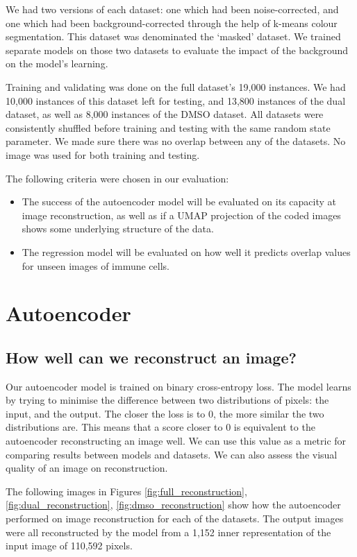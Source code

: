 We had two versions of each dataset: one which had been noise-corrected, and one which had been background-corrected through the help of k-means colour segmentation. This dataset was denominated the `masked' dataset. We trained separate models on those two datasets to evaluate the impact of the background on the model's learning. 

Training and validating was done on the full dataset's 19,000 instances. We had 10,000 instances of this dataset left for testing, and 13,800 instances of the dual dataset, as well as 8,000 instances of the DMSO dataset. All datasets were consistently shuffled before training and testing with the same random state parameter. We made sure there was no overlap between any of the datasets. No image was used for both training and testing. 

The following criteria were chosen in our evaluation:

\begin{itemize}
    \item The success of the autoencoder model will be evaluated on its capacity at image reconstruction, as well as if a UMAP projection of the coded images shows some underlying structure of the data. 
    \item The regression model will be evaluated on how well it predicts overlap values for unseen images of immune cells. 
\end{itemize}

\section{Autoencoder}

\subsection{How well can we reconstruct an image?}

Our autoencoder model is trained on binary cross-entropy loss. The model learns by trying to minimise the difference between two distributions of pixels: the input, and the output. The closer the loss is to 0, the more similar the two distributions are. This means that a score closer to 0 is equivalent to the autoencoder reconstructing an image well. We can use this value as a metric for comparing results between models and datasets. We can also assess the visual quality of an image on reconstruction. 

The following images in Figures \ref{fig:full_reconstruction}, \ref{fig:dual_reconstruction}, \ref{fig:dmso_reconstruction} show how the autoencoder performed on image reconstruction for each of the datasets. The output images were all reconstructed by the model from a 1,152 inner representation of the input image of 110,592 pixels.

